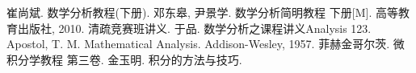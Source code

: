 \begin{thebibliography}{99}
     崔尚斌. 数学分析教程(下册).
     邓东皋, 尹景学. 数学分析简明教程 下册[M]. 高等教育出版社, 2010.
     清疏竞赛班讲义.
     于品. 数学分析之课程讲义Analysis 123.
     Apostol, T. M. Mathematical Analysis. Addison-Wesley, 1957.
     菲赫金哥尔茨. 微积分学教程 第三卷.
     金玉明. 积分的方法与技巧.
\end{thebibliography}

